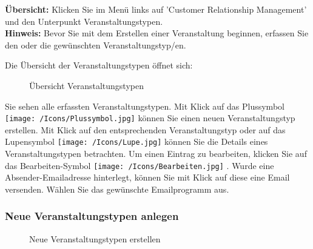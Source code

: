 \textbf{Übersicht:} Klicken Sie im Menü links auf 'Customer Relationship Management' und den Unterpunkt Veranstaltungstypen.\\


\textbf{Hinweis:} Bevor Sie mit dem Erstellen einer Veranstaltung beginnen, erfassen Sie den oder die gewünschten Veranstaltungstyp/en. 

\vspace{8cm}

Die Übersicht der Veranstaltungstypen öffnet sich:

\begin{figure}[H]
\caption{Übersicht Veranstaltungstypen}
\end{figure}

Sie sehen alle erfassten Veranstaltungstypen. Mit Klick auf das Plussymbol \texttt{[image: /Icons/Plussymbol.jpg]}  können Sie einen neuen Veranstaltungstyp erstellen. Mit Klick auf den entsprechenden Veranstaltungstyp  oder auf das Lupensymbol \texttt{[image: /Icons/Lupe.jpg]}  können Sie die Details eines Veranstaltungstypen betrachten. Um einen Eintrag zu bearbeiten, klicken Sie auf das Bearbeiten-Symbol \texttt{[image: /Icons/Bearbeiten.jpg]} . Wurde eine Absender-Emailadresse hinterlegt, können Sie mit Klick auf diese  eine Email versenden. Wählen Sie das gewünschte Emailprogramm aus.

\subsubsection{Neue Veranstaltungstypen anlegen}

\begin{figure}[H]
\caption{Neue Veranstaltungstypen erstellen}
\end{figure}

